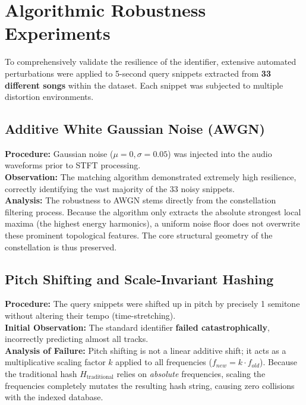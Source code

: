 \documentclass[11pt, a4paper]{article}
\begin{document}
\section{Algorithmic Robustness Experiments}
To comprehensively validate the resilience of the identifier, extensive automated perturbations were applied to 5-second query snippets extracted from \textbf{33 different songs} within the dataset. Each snippet was subjected to multiple distortion environments.

\subsection{Additive White Gaussian Noise (AWGN)}
\textbf{Procedure:} Gaussian noise ($\mu=0, \sigma=0.05$) was injected into the audio waveforms prior to STFT processing. \\
\textbf{Observation:} The matching algorithm demonstrated extremely high resilience, correctly identifying the vast majority of the 33 noisy snippets. \\
\textbf{Analysis:} The robustness to AWGN stems directly from the constellation filtering process. Because the algorithm only extracts the absolute strongest local maxima (the highest energy harmonics), a uniform noise floor does not overwrite these prominent topological features. The core structural geometry of the constellation is thus preserved.

\subsection{Pitch Shifting and Scale-Invariant Hashing}
\textbf{Procedure:} The query snippets were shifted up in pitch by precisely 1 semitone without altering their tempo (time-stretching). \\
\textbf{Initial Observation:} The standard identifier \textbf{failed catastrophically}, incorrectly predicting almost all tracks. \\
\textbf{Analysis of Failure:} Pitch shifting is not a linear additive shift; it acts as a multiplicative scaling factor $k$ applied to all frequencies ($f_{new} = k \cdot f_{old}$). Because the traditional hash $H_{\text{traditional}}$ relies on \textit{absolute} frequencies, scaling the frequencies completely mutates the resulting hash string, causing zero collisions with the indexed database.
\end{document}
